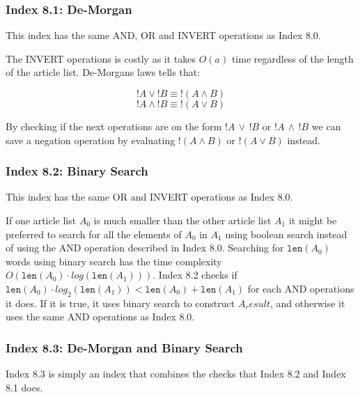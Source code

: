 \subsubsection{Index 8.1: De-Morgan}
This index has the same AND, OR and INVERT operations as Index 8.0.

The INVERT operations is costly as it takes $O(a)$ time regardless of the length of the article list. De-Morgans laws tells that:

$$!A \vee ! B \equiv !(A \wedge B)$$
$$!A \wedge ! B \equiv !(A \vee B)$$

By checking if the next operations are on the form $!A\, \vee\, !B$ or $!A\, \wedge\, ! B$ we can save a negation operation by evaluating $!(A \wedge B)$ or $!(A \vee B)$ instead.

\subsubsection{Index 8.2: Binary Search}
This index has the same OR and INVERT operations as Index 8.0.

If one article list $A_0$ is much smaller than the other article list $A_1$ it might be preferred to search for all the elements of $A_0$ in $A_1$ using boolean search instead of using the AND operation described in Index 8.0. Searching for $\texttt{len}(A_0)$ words using binary search has the time complexity $O(\texttt{len}(A_0) \cdot log(\texttt{len}(A_1)))$. Index 8.2 checks if $\texttt{len}(A_0) \cdot log_2(\texttt{len}(A_1)) < \texttt{len}(A_0) + \texttt{len}(A_1)$ for each AND operations it does. If it is true, it uses binary search to construct $A_result$, and otherwise it uses the same AND operations as Index 8.0.

\subsubsection{Index 8.3: De-Morgan and Binary Search}
Index 8.3 is simply an index that combines the checks that Index 8.2 and Index 8.1 does.

